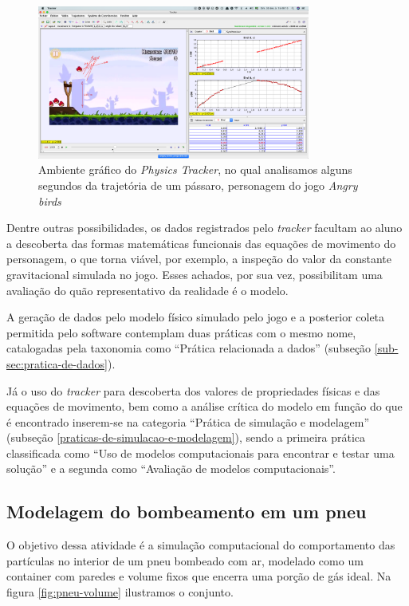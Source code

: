 \begin{figure}[!htb]
  \caption{Ambiente gráfico do \textit{Physics Tracker}, no qual analisamos alguns segundos da trajetória de um pássaro, personagem do jogo \textit{Angry birds}}
  \begin{center}
    \includegraphics[width=0.8\textwidth]{imagens/physics-tracker}
  \end{center}
  \label{fig:physics-tracker}
\end{figure}

Dentre outras possibilidades, os dados registrados pelo \textit{tracker} facultam ao aluno a descoberta das formas matemáticas funcionais das equações de movimento do personagem, o que torna viável, por exemplo, a inspeção do valor da constante gravitacional simulada no jogo. Esses achados, por sua vez, possibilitam uma avaliação do quão representativo da realidade é o modelo. 

A geração de dados pelo modelo físico simulado pelo jogo e a posterior coleta permitida pelo software contemplam duas práticas com o mesmo nome, catalogadas pela taxonomia como ``Prática relacionada a dados'' (subseção \ref{sub-sec:pratica-de-dados}). 

Já o uso do \textit{tracker} para descoberta dos valores de propriedades físicas e das equações de movimento, bem como a análise crítica do modelo em função do que é encontrado inserem-se na categoria ``Prática de simulação e modelagem'' (subseção \ref{praticas-de-simulacao-e-modelagem}), sendo a primeira prática classificada como ``Uso de modelos computacionais para encontrar e testar uma solução''  e a segunda como ``Avaliação de modelos computacionais''.   

\subsection{Modelagem do bombeamento em um pneu}

O objetivo dessa atividade é a simulação computacional do comportamento das partículas no interior de um pneu bombeado com ar, modelado como um container com paredes e volume fixos que encerra uma porção de gás ideal. Na figura \ref{fig:pneu-volume} ilustramos o conjunto.

